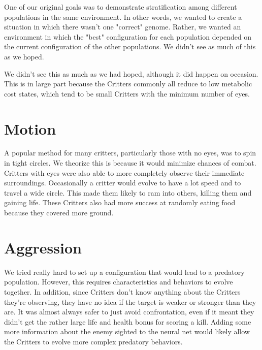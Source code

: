 One of our original goals was to demonstrate stratification among different populations in the same environment. In other words, we wanted to create a situation in which there wasn't one "correct" genome. Rather, we wanted an environment in which the "best" configuration for each population depended on the current configuration of the other populations. We didn't see as much of this as we hoped.

We didn't see this as much as we had hoped, although it did happen on occasion. This is in large part because the Critters commonly all reduce to low metabolic cost states, which tend to be small Critters with the minimum number of eyes.

\section{Motion}
A popular method for many critters, particularly those with no eyes, was to spin in tight circles. We theorize this is because it would minimize chances of combat. Critters with eyes were also able to more completely observe their immediate surroundings. Occasionally a critter would evolve to have a lot speed and to travel a wide circle. This made them likely to ram into others, killing them and gaining life. These Critters also had more success at randomly eating food because they covered more ground. 

\section{Aggression}
We tried really hard to set up a configuration that would lead to a predatory population. However, this requires characteristics and behaviors to evolve together. In addition, since Critters don't know anything about the Critters they're observing, they have no idea if the target is weaker or stronger than they are. It was almost always safer to just avoid confrontation, even if it meant they didn't get the rather large life and health bonus for scoring a kill. Adding some more information about the enemy sighted to the neural net would likely allow the Critters to evolve more complex predatory behaviors.

